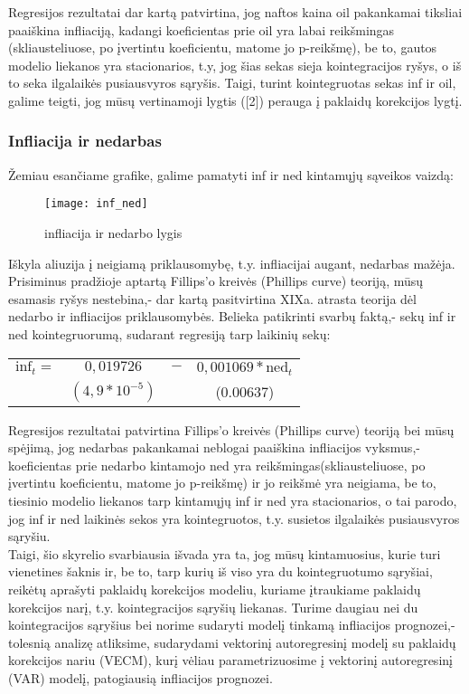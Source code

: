\documentclass[a4paper]{article}
\begin{document}
\noindent Regresijos rezultatai dar kartą patvirtina, jog naftos kaina oil pakankamai tiksliai paaiškina infliaciją, kadangi koeficientas prie oil yra labai reikšmingas (skliausteliuose, po įvertintu koeficientu, matome jo p-reikšmę), be to, gautos modelio liekanos yra stacionarios, t.y, jog šias sekas sieja kointegracijos ryšys, o iš to seka ilgalaikės pusiausvyros sąryšis. Taigi, turint kointegruotas sekas inf ir oil, galime teigti, jog mūsų vertinamoji lygtis ([2]) perauga į paklaidų korekcijos lygtį.

\newpage
\subsubsection*{Infliacija ir nedarbas}

Žemiau esančiame grafike, galime pamatyti inf ir ned kintamųjų sąveikos vaizdą:

\begin{figure}[!h]
\centering
\texttt{[image: inf\_ned]}
\caption{infliacija ir nedarbo lygis}
\end{figure}

\noindent Iškyla aliuzija į neigiamą priklausomybę, t.y. infliacijai augant, nedarbas mažėja. Prisiminus pradžioje aptartą Fillips'o kreivės (Phillips curve) teoriją, mūsų esamasis ryšys nestebina,- dar kartą pasitvirtina XIXa. atrasta teorija dėl nedarbo ir infliacijos priklausomybės. Belieka patikrinti svarbų faktą,- sekų inf ir ned kointegruorumą, sudarant regresiją tarp laikinių sekų:

\begin{center}
\begin{tabular}{cccc} 
$\text{inf}_t =$ & $0,019726$ & $-$ & $0,001069*\text{ned}_t$ \\ 
  & $(4,9*10^{-5})$ && (0.00637) \\ 
\end{tabular} 
\end{center}

\noindent Regresijos rezultatai patvirtina Fillips'o kreivės (Phillips curve) teoriją bei mūsų spėjimą, jog nedarbas pakankamai neblogai paaiškina infliacijos vyksmus,- koeficientas prie nedarbo kintamojo ned yra reikšmingas(skliausteliuose, po įvertintu koeficientu, matome jo p-reikšmę) ir jo reikšmė yra neigiama, be to, tiesinio modelio liekanos tarp kintamųjų inf ir ned yra stacionarios, o tai parodo, jog inf ir ned laikinės sekos yra kointegruotos, t.y. susietos ilgalaikės pusiausvyros sąryšiu.\\
Taigi, šio skyrelio svarbiausia išvada yra ta, jog mūsų kintamuosius, kurie turi vienetines šaknis ir, be to, tarp kurių iš viso yra du kointegruotumo sąryšiai, reikėtų aprašyti paklaidų korekcijos modeliu, kuriame įtraukiame paklaidų korekcijos narį, t.y. kointegracijos sąryšių liekanas. Turime daugiau nei du kointegracijos sąryšius bei norime sudaryti modelį tinkamą infliacijos prognozei,- tolesnią analizę atliksime, sudarydami vektorinį autoregresinį modelį su paklaidų korekcijos nariu (VECM), kurį vėliau parametrizuosime į vektorinį autoregresinį (VAR) modelį, patogiausią infliacijos prognozei.
\end{document}
